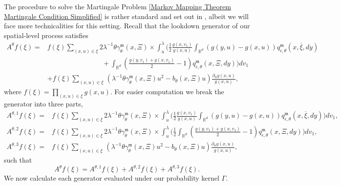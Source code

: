 \documentclass[12pt]{article}
\def \bar{\overline}
\begin{document}
The procedure to solve the Martingale Problem \eqref{Markov Mapping Theorem Martingale Condition Simplified} is rather standard and set out in \cite{kurtz/rodrigues:2011}, albeit we will face more technicalities for this setting. Recall that the lookdown generator of our spatial-level process satisfies
\begin{align}\label{Lookdown generator N lambda theta prelimit}
A^{\theta}f(\xi)=&f(\xi)\sum_{(x,u)\in\xi}2\lambda^{-1}\theta\gamma^{\mathfrak{m}}_{\theta}(x,\Xi)\times
\int_u^{
\lambda}\Bigg(\frac 12\frac{g(x,v_1)}{g(x,u)}\int_{\mathbb{R}^d} (g(y,u)-g(x,u))q^{\mathfrak{m}}_{\epsilon,\theta}(x,\bar{
\xi },dy) \nonumber \\
& \qquad \qquad \qquad \qquad +\int_{\mathbb{R}^d} \left(\frac{g(y,v_1)+g(x,v_1)}{2}-1\right)q^{\mathfrak{m}}_{\epsilon,\theta}(x,\Xi,dy)\Bigg)dv_1 \nonumber\\
&+f(\xi )\sum_{(x,u)\in\xi}\,\left(\lambda^{-1} \theta \gamma^{\mathfrak{m}}_{\theta}(x,\Xi) u^2 -b_{\theta}(x,\Xi)u\right)\frac {\partial_u g(x,u)}{g(x,u)},
\end{align}
where $f(\xi) =\prod_{(x,u) \in \xi}g(x,u)$. 
For easier computation we break the generator into three parts, 
\begin{equation}
\begin{aligned}
A^{\theta,1}f(\xi)=&f(\xi)\sum_{(x,u)\in\xi}2\lambda^{-1}\theta\gamma^{\mathfrak{m}}_{\theta}(x,\Xi)\times
\int_u^{
\lambda}\Bigg(\frac 12\frac{g(x,v_1)}{g(x,u)}\int_{\mathbb{R}^d} (g(y,u)-g(x,u))q^{\mathfrak{m}}_{\epsilon,\theta}(x,\bar{
\xi },dy)\Bigg)dv_1,\\
A^{\theta,2}f(\xi)=&f(\xi)\sum_{(x,u)\in\xi}2\lambda^{-1}\theta\gamma^{\mathfrak{m}}_{\theta}(x,\Xi)\times
\int_u^{
\lambda}\Bigg(\frac{1}{2}\int_{\mathbb{R}^d} \left(\frac{g(y,v_1)+g(x,v_1)}{2}-1\right)q^{\mathfrak{m}}_{\epsilon,\theta}(x,\Xi,dy)\Bigg)dv_1,\\
A^{\theta,3}f(\xi)=&f(\xi )\sum_{(x,u)\in\xi}\,\left(\lambda^{-1} \theta \gamma^{\mathfrak{m}}_{\theta}(x,\Xi) u^2 -b_{\theta}(x,\Xi)u\right)\frac {\partial_u g(x,u)}{g(x,u)},
\end{aligned}
\end{equation}
such that 
$$A^{\theta}f(\xi)=A^{\theta,1}f(\xi)+A^{\theta,2}f(\xi)+A^{\theta,3}f(\xi).$$
We now calculate each generator evaluated under our probability kernel $\Gamma$.
\footnotesize 
\end{document}
